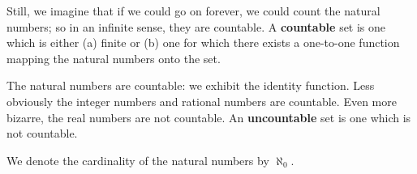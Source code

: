 Still, we imagine that if we could go on forever, we could count
the natural numbers; so in an infinite sense, they are countable.
A \textbf{countable} set is one which is either (a) finite or
(b) one for which there exists a one-to-one function mapping
the natural numbers onto the set.

The natural numbers are countable: we exhibit the identity function.
Less obviously the integer numbers and rational numbers are countable.
Even more bizarre, the real numbers are not countable.
An \textbf{uncountable} set is one which is not countable.


We denote the cardinality of the natural numbers by $\aleph_0$.
\strats
